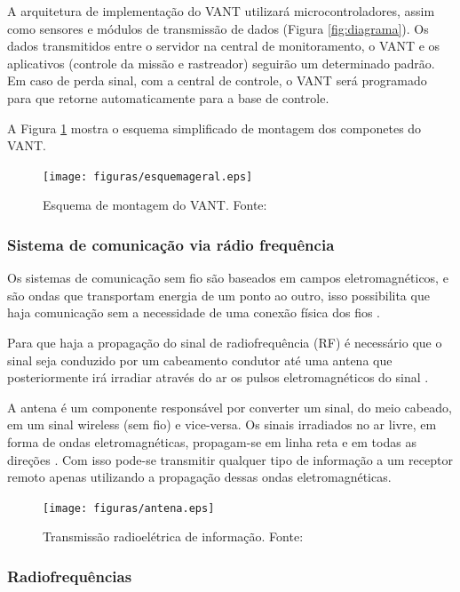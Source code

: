 A arquitetura de implementação do VANT utilizará microcontroladores, assim como sensores e módulos de transmissão de dados (Figura \ref{fig:diagrama}).
Os dados transmitidos entre o servidor na central de monitoramento, o VANT e os aplicativos (controle da missão e rastreador) seguirão um determinado padrão. Em caso de perda sinal, com a central de controle, o VANT será programado para que retorne automaticamente para a base de controle.

A Figura \ref{fig:esquemageral} mostra o esquema simplificado de montagem dos componetes do VANT.

\begin{figure}[h!]
	\centering
	  \texttt{[image: figuras/esquemageral.eps]}
	\caption{Esquema de montagem do VANT. Fonte:\cite{esquematico}}
	\label{fig:esquemageral}
\end{figure}


\subsubsection{Sistema de comunicação via rádio frequência}

Os sistemas de comunicação sem fio são baseados em campos eletromagnéticos, e são ondas que transportam energia de um ponto ao outro, isso possibilita que haja comunicação sem a necessidade de uma conexão física dos fios \cite{VALLE1}. 

Para que haja a propagação do sinal de radiofrequência (RF) é necessário que o sinal seja conduzido por um cabeamento condutor até uma antena que posteriormente irá irradiar através do ar os pulsos eletromagnéticos do sinal \cite{VALLE1}. 

A antena é um componente responsável por converter um sinal, do meio cabeado, em um sinal wireless (sem fio) e vice-versa. Os sinais irradiados no ar livre, em forma de ondas eletromagnéticas, propagam-se em linha reta e em todas as direções \cite{Rappaport2}. Com isso pode-se transmitir qualquer tipo de informação a um receptor remoto apenas utilizando a propagação dessas ondas eletromagnéticas.

\begin{figure}[h!]
	\centering
	  \texttt{[image: figuras/antena.eps]}
	\caption{Transmissão radioelétrica de informação. Fonte: \cite{antena}}
	\label{fig:antena}
\end{figure}

\subsubsection{Radiofrequências}

